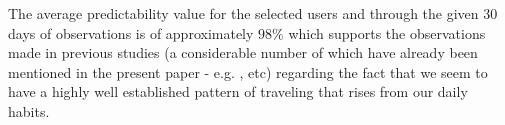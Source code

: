 The average predictability value for the selected users and through the given
$30$ days of observations is of approximately $98\%$ which supports the
observations made in previous studies (a considerable number of which have
already been mentioned in the present paper - e.g. \cite{song2010limits},
\cite{Barabasi08} etc) regarding the fact that we seem to have a highly well
established pattern of traveling that rises from our daily habits.

